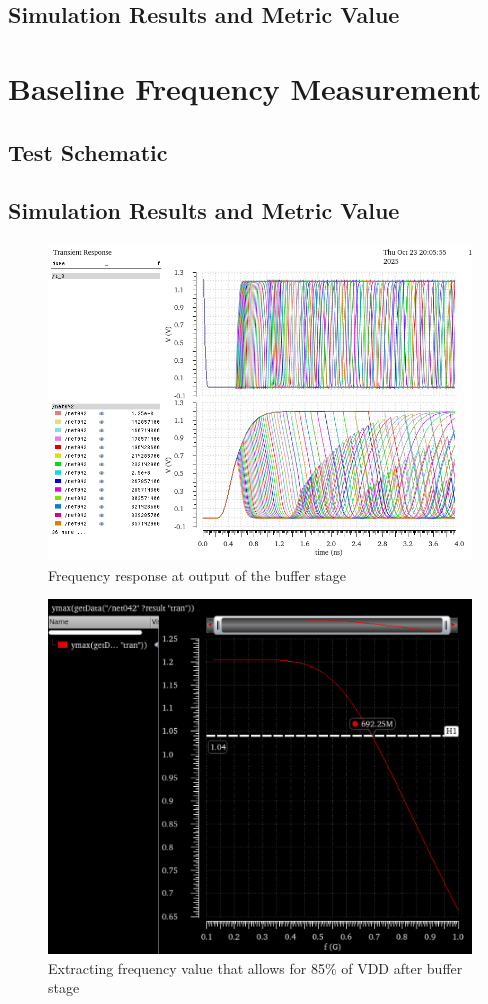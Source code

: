 \documentclass[12pt]{article}
\begin{document}
\newpage

\subsection{Simulation Results and Metric Value}



\newpage

\section{Baseline Frequency Measurement}
\subsection{Test Schematic}



\newpage

\subsection{Simulation Results and Metric Value}

\begin{figure}[H]
    \centering
    \includegraphics[width=0.75\linewidth]{writeup//figures/frequency_response_param.png}
    \caption{Frequency response at output of the buffer stage}
\end{figure}

\begin{figure}[H]
    \centering
    \includegraphics[width=0.75\linewidth]{writeup//figures/max_frequencies.png}
    \caption{Extracting frequency value that allows for 85\% of VDD after buffer stage}
\end{figure}
\end{document}
